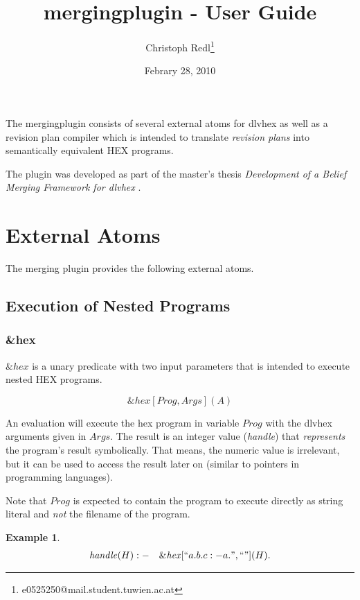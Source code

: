 \documentclass[a4paper,11pt]{article}
\theoremstyle{definition}
\newtheorem{example}{Example}
\newenvironment{mathprogram}[1][P]
	{
		\renewcommand{\ruleimplication}{&:-&}
		\newcommand{\ruledelimiter}{1}
		\begin{eqnarray*}
	}
	{
		\end{eqnarray*}
	}
\newcommand{\ruleimplication}{\ensuremath{\mathit{:-}}}
\newcommand{\hex}{\textsf{HEX}\xspace }
\newcommand{\dlvhex}{\textsf{dlvhex}\xspace }
\begin{document}
	\title{mergingplugin - User Guide}
	\date{Febrary 28, 2010}
	\author{Christoph Redl\footnote{e0525250@mail.student.tuwien.ac.at}}
	\maketitle

	The mergingplugin consists of several external atoms for \dlvhex as well as a revision plan compiler which is intended to translate \emph{revision plans} into semantically equivalent
	\hex programs.
	
	The plugin was developed as part of the master's thesis \emph{Development of a Belief Merging Framework for \dlvhex} \cite{CR10BMF}.

	
	\section{External Atoms}
	\label{sec:ExternalAtoms}

	The merging plugin provides the following external atoms.


		\subsection{Execution of Nested Programs}
		\label{sec:ExternalAtoms:Execution}


			\subsubsection{\&hex}

				$\mathit{\&hex}$ is a unary predicate with two input parameters that is intended to execute nested \hex programs.
			
					$$\mathit{\&hex}[\mathit{Prog}, \mathit{Args}](A)$$

				An evaluation will execute the hex program in variable $\mathit{Prog}$ with the \dlvhex arguments given in $\mathit{Args}$. The result is an integer value (\emph{handle})
				that \emph{represents} the program's result symbolically. That means, the numeric value is irrelevant, but it can be used to access the result later on (similar to
				pointers in programming languages).
				
				Note that $\mathit{Prog}$ is expected to contain the program to execute directly as string literal and \emph{not} the filename of the program.
				
				\begin{example}
					\label{ex:Calling1}
					\begin{mathprogram}
\mathit{handle}(H) \ruleimplication \mathit{\&hex}[``a. b. c :- a.", ``"](H).
					\end{mathprogram}
				\end{example}
\end{document}
